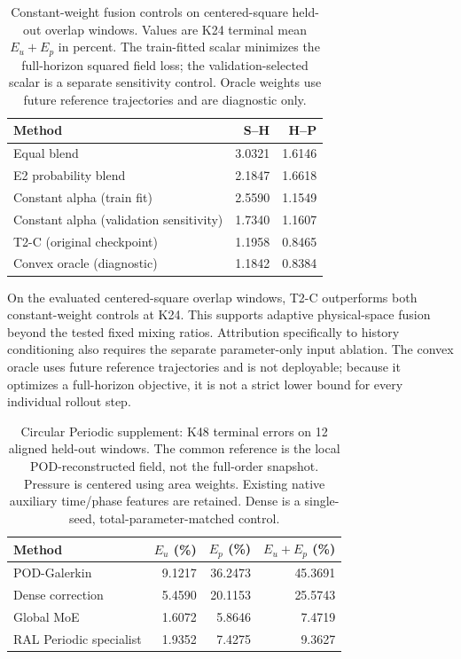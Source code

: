 \begin{table}[t]
\centering\small
\caption{Constant-weight fusion controls on centered-square held-out overlap windows. Values are K24 terminal mean $E_u+E_p$ in percent. The train-fitted scalar minimizes the full-horizon squared field loss; the validation-selected scalar is a separate sensitivity control. Oracle weights use future reference trajectories and are diagnostic only.}
\label{tab:constant_alpha_supplement}
\begin{tabular}{lrr}
\toprule Method & S--H & H--P\\\midrule
Equal blend & 3.0321 & 1.6146\\
E2 probability blend & 2.1847 & 1.6618\\
Constant alpha (train fit) & 2.5590 & 1.1549\\
Constant alpha (validation sensitivity) & 1.7340 & 1.1607\\
T2-C (original checkpoint) & 1.1958 & 0.8465\\
Convex oracle (diagnostic) & 1.1842 & 0.8384\\
\bottomrule\end{tabular}
\end{table}

On the evaluated centered-square overlap windows, T2-C outperforms both
constant-weight controls at K24. This supports adaptive physical-space fusion
beyond the tested fixed mixing ratios. Attribution specifically to history
conditioning also requires the separate parameter-only input ablation.
The convex oracle uses future reference trajectories and is not deployable;
because it optimizes a full-horizon objective, it is not a strict lower bound
for every individual rollout step.

\begin{table}[t]
\centering\small
\caption{Circular Periodic supplement: K48 terminal errors on 12 aligned held-out windows. The common reference is the local POD-reconstructed field, not the full-order snapshot. Pressure is centered using area weights. Existing native auxiliary time/phase features are retained. Dense is a single-seed, total-parameter-matched control.}
\label{tab:dense_aligned_supplement}
\begin{tabular}{lrrr}
\toprule Method & $E_u$ (\%) & $E_p$ (\%) & $E_u+E_p$ (\%)\\\midrule
POD-Galerkin & 9.1217 & 36.2473 & 45.3691\\
Dense correction & 5.4590 & 20.1153 & 25.5743\\
Global MoE & 1.6072 & 5.8646 & 7.4719\\
RAL Periodic specialist & 1.9352 & 7.4275 & 9.3627\\
\bottomrule\end{tabular}
\end{table}

